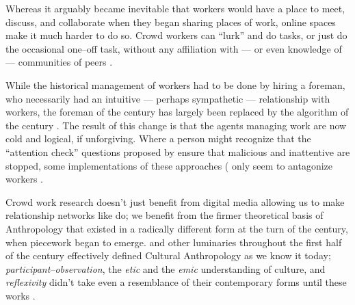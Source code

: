 \documentclass[trackingWork]{subfiles}
\begin{document}



\subsubsubsection{\whatchanged}
Whereas it arguably became inevitable that workers would have a place to
meet, discuss, and collaborate
when they began sharing places of work,
online spaces make it much harder to do so.
Crowd workers can ``lurk'' and do tasks, or just do the occasional one--off task,
without any affiliation with
--- or even knowledge of ---
communities of peers
\cite{miller2011understanding,mcinnis2016one,earl2011digitally}.

While the historical management of workers had to be done by hiring a foreman,
who necessarily had an intuitive
--- perhaps sympathetic ---
relationship with workers,
the foreman of the  century has largely been replaced
by the algorithm of the  century
\cite{uberAlgorithm}.
The result of this change is that the agents managing work are now
cold and logical, if unforgiving.
Where a person might recognize that the ``attention check'' questions 
proposed by \citeauthor{le2010ensuring} ensure that malicious and inattentive are stopped,
some implementations of these approaches
(\cite[see][]{MaliciousCrowdworkersGadiraju}
only seem to antagonize workers
\cite{le2010ensuring,MaliciousCrowdworkersGadiraju}.



\subsubsubsection{\implication}
Crowd work research doesn't just benefit from
digital media allowing us to make
relationship networks like \citeauthor{crowdcollab} do;
we benefit from the firmer theoretical basis of Anthropology that
existed in a radically different form at the turn of the  century,
when piecework began to emerge.
\citeauthor{malinowski2002argonauts,boas1940race,mead1973coming} and
other luminaries throughout the first half of the  century
effectively defined Cultural Anthropology as we know it today;
\textit{participant--observation},
the \textit{etic} and the \textit{emic} understanding of culture, and
\textit{reflexivity}
didn't take even a resemblance of their contemporary forms until these works
\cite{malinowski2002argonauts,boas1940race,mead1973coming}.
\end{document}
